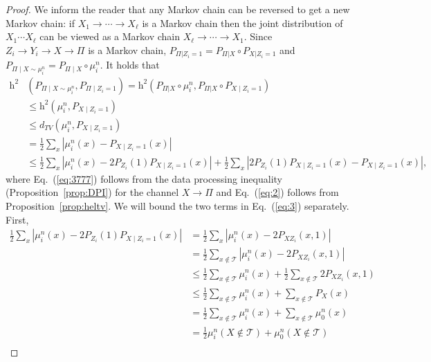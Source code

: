 \documentclass[final, 12pt]{colt2018}
\providecommand{\helli}{\mathrm{h}}
\renewcommand{\eqref}[1]{Eq.~(\ref{#1})}
\begin{document}
\begin{proof}
We inform the reader that any Markov chain can be reversed to get a new Markov chain: if $X_1 \to \cdots \to X_\ell$ is a Markov chain then the joint distribution of $X_1 \cdots X_\ell$  can be viewed as a Markov chain $X_\ell \to \cdots \to X_1$. Since $Z_i \to Y_i \to X \to \Pi$ is a Markov chain, $P_{\Pi | Z_i = 1} = P_{\Pi| X} \circ P_{X | Z_i=1}$ and $P_{\Pi \mid X \sim \mu_i^n} = P_{\Pi \mid X} \circ \mu_i^n$.
It holds that
\begin{align}
\helli^2&\left( P_{\Pi \mid X \sim \mu_i^n}, P_{\Pi \mid Z_i = 1} \right)
= \helli^2\left( P_{\Pi|X} \circ \mu_i^n, P_{\Pi|X} \circ P_{X \mid Z_i = 1} \right) \nonumber \\
&\le \helli^2\left( \mu_i^n, P_{X \mid Z_i = 1} \right) \label{eq:3777}\\
&\le d_{TV}\left( \mu_i^n, P_{X \mid Z_i = 1} \right) \label{eq:2} \\
&= \frac{1}{2} \sum_{x} \left\lvert \mu_i^n(x) - P_{X \mid Z_i = 1}(x) \right\rvert \nonumber \\
&\le \frac{1}{2} \sum_{x} \left\lvert \mu_i^n(x) - 2P_{Z_i}(1) P_{X \mid Z_i = 1}(x) \right\rvert 
+ \frac{1}{2} \sum_{x} \left\lvert 2 P_{Z_i}(1) P_{X \mid Z_i = 1}(x) - P_{X \mid Z_i = 1}(x) \right\rvert, \label{eq:3}
\end{align}
where \eqref{eq:3777} follows from the data processing inequality (Proposition~\ref{prop:DPI}) for the channel $X \to \Pi$ and \eqref{eq:2} follows from Proposition~\ref{prop:heltv}.
We will bound the two terms in \eqref{eq:3} separately. First,
\begin{align}
\frac{1}{2}\sum_x \left\lvert \mu_i^n(x) - 2P_{Z_i}(1) P_{X \mid Z_i = 1}(x) \right\vert
&= \frac{1}{2}\sum_x \left\lvert \mu_i^n(x) - 2P_{X Z_i}(x, 1) \right\vert\nonumber\\
&= \frac{1}{2}\sum_{x \notin \mathcal{T}} \left\lvert \mu_i^n(x) - 2P_{X Z_i}(x, 1) \right\vert \label{eq:6911}\\
&\le \frac{1}{2}\sum_{x \notin \mathcal{T}} \mu_i^n(x) + \frac{1}{2}\sum_{x \notin \mathcal{T}} 2P_{X Z_i}(x, 1) \nonumber\\
&\le \frac{1}{2} \sum_{x \notin \mathcal{T}} \mu_i^n(x) + \sum_{x \notin \mathcal{T}} P_X(x) \nonumber\\
&= \frac{1}{2} \sum_{x \notin \mathcal{T}} \mu_i^n(x) + \sum_{x \notin \mathcal{T}} \mu_0^n(x) \label{eq:375}\\
&= \frac{1}{2} \mu_i^n(X \notin \mathcal{T}) + \mu_0^n(X \notin \mathcal{T}) \nonumber\\

\end{align}
\end{proof}
\end{document}
